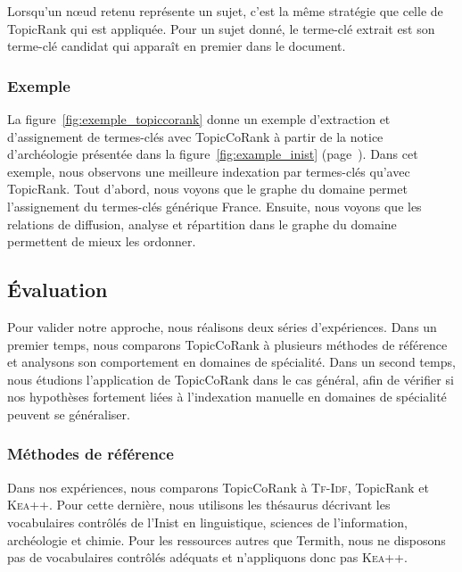       Lorsqu'un n\oe{}ud retenu représente un sujet, c'est la même stratégie
      que celle de Topic\-Rank qui est appliquée. Pour un sujet donné, le
      terme-clé extrait est son terme-clé candidat qui apparaît en premier
      dans le document.

    \subsubsection{Exemple}
    \label{subsubsec:main-domain_specific_keyphrase_annotation-supervised_automatic_keyphrase_extraction-topiccorank-exemple}
      La figure~\ref{fig:exemple_topiccorank} donne un exemple d'extraction
      et d'assignement de
      termes-clés avec TopicCoRank à partir de la notice d'archéologie
      présentée dans la figure~\ref{fig:example_inist} (page~\pageref{fig:example_inist}). Dans cet exemple,
      nous observons une meilleure indexation par termes-clés qu'avec
      TopicRank. Tout d'abord, nous voyons que le graphe du domaine permet
      l'assignement du termes-clés générique \og{}France\fg{}. Ensuite, nous
      voyons que les relations de \og{}diffusion\fg{}, \og{}analyse\fg{} et
      \og{}répartition\fg{} dans le graphe du domaine permettent de mieux les
      ordonner.
      

  \subsection{Évaluation}
  \label{subsec:main-domain_specific_keyphrase_annotation-supervised_automatic_keyphrase_annotation-evaluation}
    Pour valider notre approche, nous réalisons deux séries d'expériences.
    Dans un premier temps, nous comparons TopicCoRank à plusieurs méthodes de
    référence et analysons son comportement en domaines de spécialité. Dans
    un second temps, nous étudions l'application de TopicCoRank dans le cas
    général, afin de vérifier si nos hypothèses fortement liées à l'indexation
    manuelle en domaines de spécialité peuvent se généraliser.

    \subsubsection{Méthodes de référence}
    \label{subsubsec:main-domain_specific_keyphrase_annotation-supervised_automatic_keyphrase_annotation-evaluation-baselines}
      Dans nos expériences, nous comparons TopicCoRank à \textsc{Tf-Idf},
      TopicRank et \textsc{Kea++}. Pour cette dernière, nous utilisons les
      thésaurus décrivant les vocabulaires contrôlés de l'Inist en
      linguistique, sciences de l'information, archéologie et chimie. Pour les
      ressources autres que Termith, nous ne disposons pas de vocabulaires
      contrôlés adéquats et n'appliquons donc pas \textsc{Kea++}.

